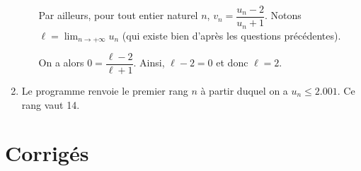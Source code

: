 \documentclass[11pt,fleqn, openany]{book} %
\begin{document}
\begin{solution}
\begin{enumerate}
\begin{enumerate}
 Par ailleurs, pour tout entier naturel $n$, $v_n=\dfrac{u_n-2}{u_n+1}$. Notons $\ell=\displaystyle\lim_{n\to+\infty}u_n$ (qui existe bien d'après les questions précédentes). 

On a alors $0=\dfrac{\ell-2}{\ell+1}$. Ainsi, $\ell-2=0$ et donc $\ell=2$. 
\end{enumerate}
\item Le programme renvoie le premier rang $n$ à partir duquel on a $u_n\leqslant 2.001$. Ce rang vaut 14.
\end{enumerate}
\end{solution}




\chapter{Corrigés}


\printsolutions[headings={false} ]
 
\end{document}
